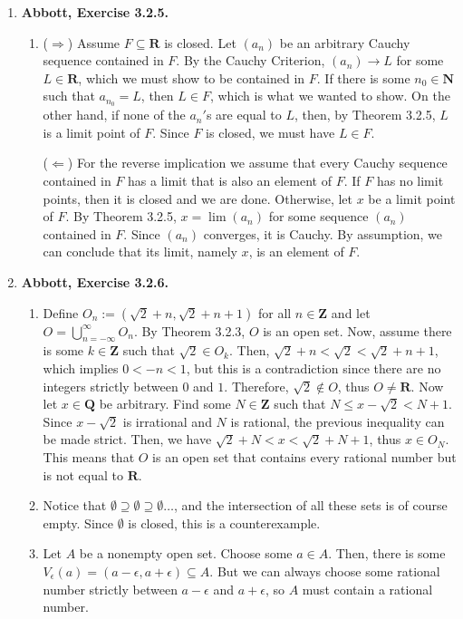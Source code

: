 \documentclass{article}
\newcommand{\N}{\mathbf{N}}
\newcommand{\Z}{\mathbf{Z}}
\newcommand{\Q}{\mathbf{Q}}
\newcommand{\R}{\mathbf{R}}
\newcommand{\exc}[2][Abbott]{\item \textbf{#1, Exercise #2.}}
\begin{document}
\begin{enumerate}
    \exc{3.2.5}
    \begin{enumerate}
        \item ($\Rightarrow$) Assume $F \subseteq \R$ is closed. Let $(a_n)$ be an arbitrary Cauchy sequence contained in $F$. By the Cauchy Criterion, $(a_n) \to L$ for some $L \in \R$, which we must show to be contained in $F$. If there is some $n_0 \in \N$ such that $a_{n_0} = L$, then $L \in F$, which is what we wanted to show. On the other hand, if none of the $a_n'$s are equal to $L$, then, by Theorem 3.2.5, $L$ is a limit point of $F$. Since $F$ is closed, we must have $L \in F$.
        
        ($\Leftarrow$) For the reverse implication we assume that every Cauchy sequence contained in $F$ has a limit that is also an element of $F$. If $F$ has no limit points, then it is closed and we are done. Otherwise, let $x$ be a limit point of $F$. By Theorem 3.2.5, $x = \lim(a_n)$ for some sequence $(a_n)$ contained in $F$. Since $(a_n)$ converges, it is Cauchy. By assumption, we can conclude that its limit, namely $x$, is an element of $F$.
    \end{enumerate}
    
    \exc{3.2.6}
    \begin{enumerate}
        \item Define $O_n := (\sqrt{2}+n,\sqrt{2}+n+1)$ for all $n \in \Z$ and let $O = \bigcup_{n=-\infty}^\infty O_n$. By Theorem 3.2.3, $O$ is an open set. Now, assume there is some $k \in \Z$ such that $\sqrt{2} \in O_k$. Then, $\sqrt{2}+n<\sqrt{2} < \sqrt{2}+n+1$, which implies $0 < -n < 1$, but this is a contradiction since there are no integers strictly between $0$ and $1$. Therefore, $\sqrt{2} \notin O$, thus $O \neq \R$. Now let $x \in \Q$ be arbitrary. Find some $N \in \Z$ such that $N \leq x-\sqrt{2} < N+1$. Since $x-\sqrt{2}$ is irrational and $N$ is rational, the previous inequality can be made strict. Then, we have $\sqrt{2} + N < x < \sqrt{2} + N + 1$, thus $x \in O_N$. This means that $O$ is an open set that contains every rational number but is not equal to $\R$.
        
        \item Notice that $\emptyset \supseteq \emptyset \supseteq \emptyset \dots$, and the intersection of all these sets is of course empty. Since $\emptyset$ is closed, this is a counterexample.
        
        \item Let $A$ be a nonempty open set. Choose some $a \in A$. Then, there is some $V_\epsilon(a) = (a-\epsilon, a+\epsilon) \subseteq A$. But we can always choose some rational number strictly between $a-\epsilon$ and $a + \epsilon$, so $A$ must contain a rational number.
        

\end{enumerate}
\end{enumerate}
\end{document}

